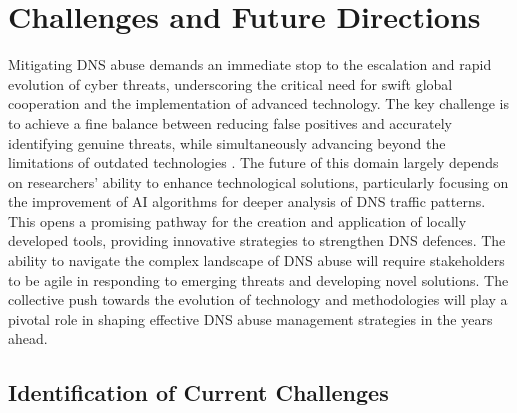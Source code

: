 \section{Challenges and Future Directions}

Mitigating DNS abuse demands an immediate stop to the escalation and rapid evolution of cyber threats, underscoring the critical need for swift global cooperation and the implementation of advanced technology. The key challenge is to achieve a fine balance between reducing false positives and accurately identifying genuine threats, while simultaneously advancing beyond the limitations of outdated technologies \cite{pour2023comprehensive}. The future of this domain largely depends on researchers' ability to enhance technological solutions, particularly focusing on the improvement of AI algorithms for deeper analysis of DNS traffic patterns. This opens a promising pathway for the creation and application of locally developed tools, providing innovative strategies to strengthen DNS defences. The ability to navigate the complex landscape of DNS abuse will require stakeholders to be agile in responding to emerging threats and developing novel solutions. The collective push towards the evolution of technology and methodologies will play a pivotal role in shaping effective DNS abuse management strategies in the years ahead.


\subsection{Identification of Current Challenges}

